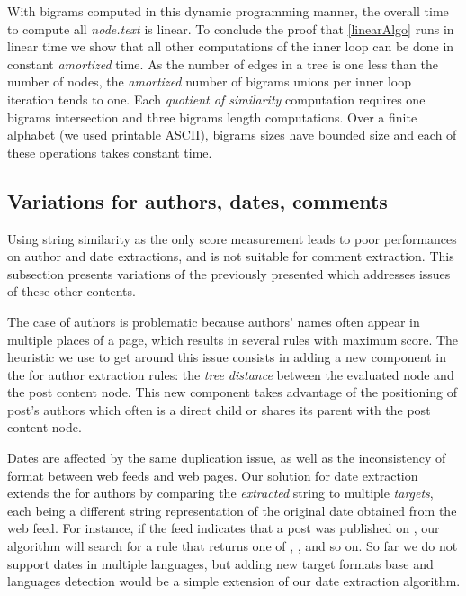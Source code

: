 \linearAlgo

With bigrams computed in this dynamic programming manner, the overall time to compute all \code{(}\emph{node.text}\code{)} is linear. To conclude the proof that \autoref{linearAlgo} runs in linear time we show that all other computations of the inner loop can be done in constant \emph{amortized} time. As the number of edges in a tree is one less than the number of nodes, the \emph{amortized} number of bigrams unions per inner loop iteration tends to one. Each \emph{quotient of similarity} computation requires one bigrams intersection and three bigrams length computations. Over a finite alphabet (we used printable ASCII), bigrams sizes have bounded size and each of these operations takes constant time.


\subsection{Variations for authors, dates, comments}
\label{variationsforauthorsdatesandcomments}

Using string similarity as the only score measurement leads to poor performances on author and date extractions, and is not suitable for comment extraction. This subsection presents variations of the previously presented  which addresses issues of these other contents.

The case of authors is problematic because authors' names often appear in multiple places of a page, which results in several rules with maximum  score. The heuristic we use to get around this issue consists in adding a new component in the  for author extraction rules: the \emph{tree distance} between the evaluated node and the post content node. This new component takes advantage of the positioning of post's authors which often is a direct child or shares its parent with the post content node.

Dates are affected by the same duplication issue, as well as the inconsistency of format between web feeds and web pages. Our solution for date extraction extends the  for authors by comparing the \emph{extracted} string to multiple \emph{targets}, each being a different string representation of the original date obtained from the web feed. For instance, if the feed indicates that a post was published on , our algorithm will search for a rule that returns one of , ,  and so on. So far we do not support dates in multiple languages, but adding new target formats base and languages detection would be a simple extension of our date extraction algorithm.

